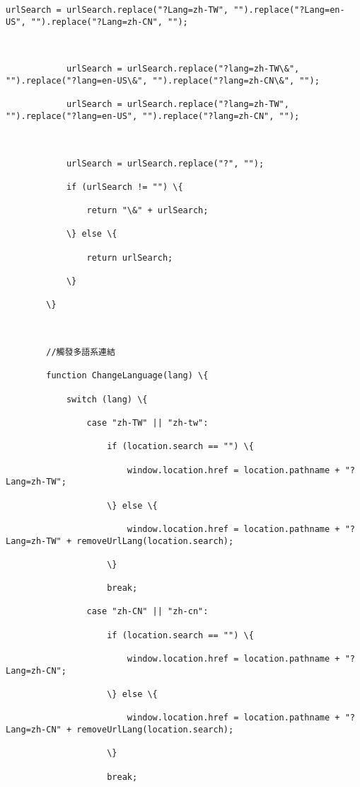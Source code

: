 \documentclass[11pt]{article}
\begin{document}
\begin{Verbatim}[commandchars=\\\{\}]
            urlSearch = urlSearch.replace("?Lang=zh-TW", "").replace("?Lang=en-US", "").replace("?Lang=zh-CN", "");



            urlSearch = urlSearch.replace("?lang=zh-TW\&", "").replace("?lang=en-US\&", "").replace("?lang=zh-CN\&", "");

            urlSearch = urlSearch.replace("?lang=zh-TW", "").replace("?lang=en-US", "").replace("?lang=zh-CN", "");



            urlSearch = urlSearch.replace("?", "");

            if (urlSearch != "") \{

                return "\&" + urlSearch;

            \} else \{

                return urlSearch;

            \}

        \}



        //觸發多語系連結

        function ChangeLanguage(lang) \{

            switch (lang) \{

                case "zh-TW" || "zh-tw":

                    if (location.search == "") \{

                        window.location.href = location.pathname + "?Lang=zh-TW";

                    \} else \{

                        window.location.href = location.pathname + "?Lang=zh-TW" + removeUrlLang(location.search);

                    \}

                    break;

                case "zh-CN" || "zh-cn":

                    if (location.search == "") \{

                        window.location.href = location.pathname + "?Lang=zh-CN";

                    \} else \{

                        window.location.href = location.pathname + "?Lang=zh-CN" + removeUrlLang(location.search);

                    \}

                    break;


\end{Verbatim}
\end{document}
